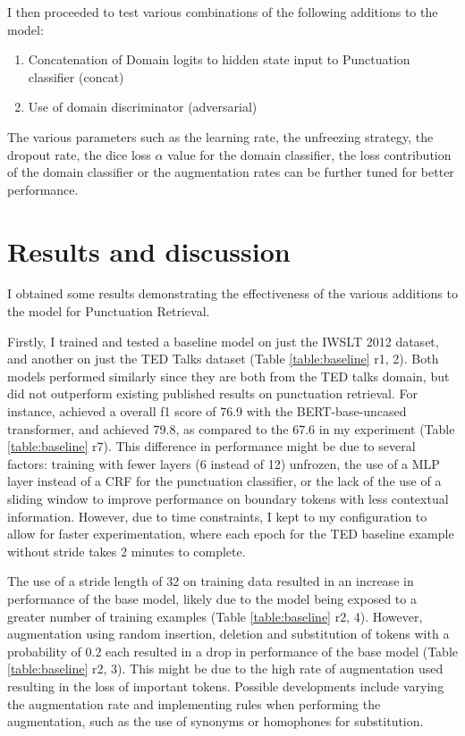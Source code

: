\documentclass[a4paper]{article}
\begin{document}
\begin{multicols}{2}
I then proceeded to test various combinations of the following additions to the model: 
\begin{enumerate}
    \item Concatenation of Domain logits to hidden state input to Punctuation classifier (concat)
    \item Use of domain discriminator (adversarial)
\end{enumerate}

The various parameters such as the learning rate, the unfreezing strategy, the dropout rate, the dice loss $\alpha$ value for the domain classifier, the loss contribution of the domain classifier or the augmentation rates can be further tuned for better performance.

\section{Results and discussion}
I obtained some results demonstrating the effectiveness of the various additions to the model for Punctuation Retrieval.

Firstly, I trained and tested a baseline model on just the IWSLT 2012 dataset, and another on just the TED Talks dataset (Table \ref{table:baseline} r1, 2). Both models performed similarly since they are both from the TED talks domain, but did not outperform existing published results on punctuation retrieval. For instance, \citet{noisy} achieved a overall f1 score of 76.9 with the BERT-base-uncased transformer, and \citet{nagy2021automatic} achieved 79.8, as compared to the 67.6 in my experiment (Table \ref{table:baseline} r7). This difference in performance might be due to several factors: training with fewer layers (6 instead of 12) unfrozen,  the use of a MLP layer instead of a CRF for the punctuation classifier, or the lack of the use of a sliding window to improve performance on boundary tokens with less contextual information. However, due to time constraints, I kept to my configuration to allow for faster experimentation, where each epoch for the TED baseline example without stride takes 2 minutes to complete.

The use of a stride length of 32 on training data resulted in an increase in performance of the base model, likely due to the model being exposed to a greater number of training examples (Table \ref{table:baseline} r2, 4). However, augmentation using random insertion, deletion and substitution of tokens with a probability of 0.2 each resulted in a drop in performance of the base model (Table \ref{table:baseline} r2, 3). This might be due to the high rate of augmentation used resulting in the loss of important tokens. Possible developments include varying the augmentation rate and implementing rules when performing the augmentation, such as the use of synonyms or homophones for substitution. 


\end{multicols}
\end{document}
